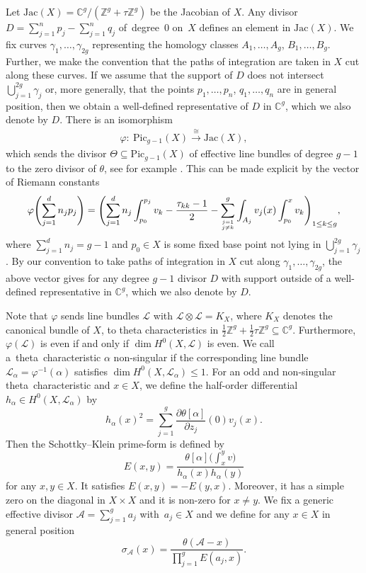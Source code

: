 \documentclass[pdftex]{sigma}
\numberwithin{equation}{section}
\newcommand\gf[2]{\genfrac{}{}{0pt}{}{#1}{#2}}
\begin{document}
Let $\mathrm{Jac}(X)=\mathbb{C}^g/(\mathbb{Z}^g+\tau\mathbb{Z}^g)$ be the Jacobian of $X$. Any divisor $D=\sum_{j=1}^n p_j-\sum_{j=1}^n q_j$ of~degree~$0$ on~$X$ defines an element  in $\mathrm{Jac}(X)$. We fix curves $\gamma_1,\dots,\gamma_{2g}$ representing the homology classes $A_1,\dots,A_g$, $B_1,\dots,B_g$. Further, we make the convention that the paths of integration are taken in $X$ cut along these curves. If we assume that the support of $D$ does not intersect $\bigcup_{j=1}^{2g}\gamma_j$ or, more generally, that the points $p_1,\dots, p_n$, $q_1,\dots,q_n$ are in general position, then we obtain a well-defined representative of $D$ in $\mathbb{C}^g$, which we also denote by $D$. There is an isomorphism
\begin{align}\label{picjacisom}
	\varphi\colon\ \mathrm{Pic}_{g-1}(X)\xrightarrow{\cong} \mathrm{Jac}(X),
\end{align}
which sends the divisor $\Theta\subseteq \mathrm{Pic}_{g-1}(X)$ of effective line bundles of degree $g-1$ to the zero divisor of $\theta$, see for example \cite[Corollary II.3.6]{Mum83}. This can be made explicit by the vector of Riemann constants
\[
\varphi\Biggl(\sum_{j=1}^d n_j p_j\Biggr)=\Biggl(\sum_{j=1}^d n_j\int_{p_0}^{p_j} v_k-\frac{\tau_{kk}-1}{2}-\sum_{\gf{j=1}{j\neq k}}^{g}\int_{A_j}v_j(x)\int_{p_0}^x v_k\Biggr)_{1\le k\le g},\]
where $\sum_{j=1}^d n_j=g-1$ and $p_0\in X$ is some fixed base point not lying in $\bigcup_{j=1}^{2g}\gamma_j$. By our convention to take paths of integration in $X$ cut along $\gamma_1,\dots,\gamma_{2g}$, the above vector gives for any degree $g-1$ divisor $D$ with support outside of  a well-defined representative in $\mathbb{C}^g$, which we also denote by $D$.

Note that $\varphi$ sends line bundles $\mathscr{L}$ with $\mathscr{L}\otimes\mathscr{L}=K_X$, where $K_X$ denotes the canonical bundle of $X$, to theta characteristics in $\frac{1}{2}\mathbb{Z}^g+\frac{1}{2}\tau\mathbb{Z}^g\subseteq \mathbb{C}^g$. Furthermore, $\varphi(\mathscr{L})$ is even if and only if $\dim H^0(X,\mathscr{L})$ is even. We call a~theta~characteristic $\alpha$ non-singular if the corresponding line bundle $\mathscr{L}_\alpha=\varphi^{-1}(\alpha)$ satisfies $\dim H^0(X,\mathscr{L}_\alpha)\le 1$.
For an odd and non-singular theta~characteristic  and $x\in X$, we define the half-order differential $h_\alpha\in H^0(X,\mathscr{L}_\alpha)$ by
\[h_{\alpha}(x)^2=\sum_{j=1}^g\frac{\partial\theta[\alpha]}{\partial z_j}(0)v_j(x).\]
Then the Schottky--Klein prime-form is defined by
\[
E(x,y)=\frac{\theta[\alpha]\bigl(\int_x^yv\bigr)}{h_{\alpha}(x)h_{\alpha}(y)}
\]
for any $x,y\in X$. It satisfies $E(x,y)=-E(y,x)$. Moreover, it has a simple zero on the diagonal in $X\times X$ and it is non-zero for $x\neq y$. We fix a generic effective divisor $\mathcal{A}=\sum_{j=1}^g a_j$ with~${a_j\in X}$ and we define for any $x\in X$ in general position
\[
\sigma_{\mathcal{A}}(x)=\frac{\theta(\mathcal{A}-x)}{\prod_{j=1}^gE(a_j,x)}.
\]
\end{document}
